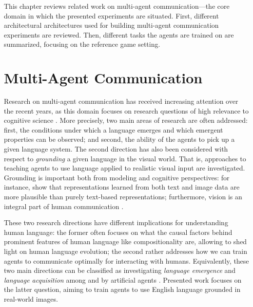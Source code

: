 
This chapter reviews related work on multi-agent communication---the core domain in which the presented experiments are situated. First, different architectural architectures used for building multi-agent communication experiments are reviewed. Then, different tasks the agents are trained on are summarized, focusing on the reference game setting. 


\section{Multi-Agent Communication}
Research on multi-agent communication has received increasing attention over the recent years, as this domain focuses on research questions of high relevance to cognitive science \parencite{lazaridou2020emergent}. More precisely, two main areas of research are often addressed: first, the conditions under which a language emerges and which emergent properties can be observed; and second, the ability of the agents to pick up a given language system. %
The second direction has also been considered with respect to \textit{grounding} a given language in the visual world. That is, approaches to teaching agents to use language applied to realistic visual input are investigated. Grounding is important both from modeling and cognitive perspectives: for instance, \cite{bruni2014multimodal} show that representations learned from both text and image data are more plausible than purely text-based representations; furthermore, vision is an integral part of human communication \parencite{tomasello2010origins, harnad1990symbol}. 

These two research directions have different implications for understanding human language: the former often focuses on what the causal factors behind prominent features of human language like compositionality are, allowing to shed light on human language evolution; the second rather addresses how we can train agents to communicate optimally for interacting with humans. Equivalently, these two main directions can be classified as investigating \textit{language emergence} and \textit{language acquisition} among and by artificial agents \parencite{lazaridou2018emergence, lazaridou2020emergent}.
Presented work focuses on the latter question, aiming to train agents to use English language grounded in real-world images.

